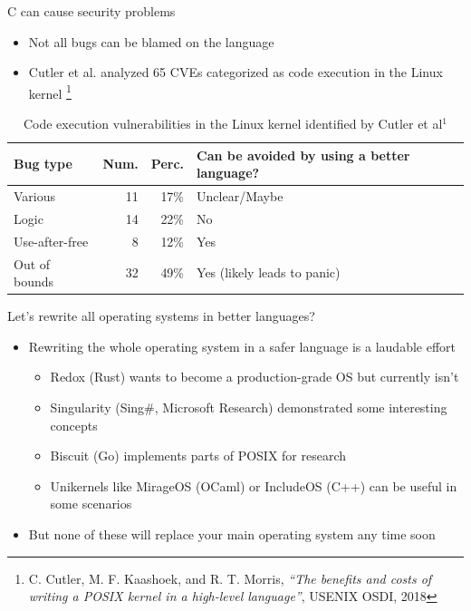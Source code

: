 \documentclass[NET,english,aspectratio=169,notitleframe]{tumbeamer}
\begin{document}
\begin{frame}{C can cause security problems}
\begin{itemize}
\item Not all bugs can be blamed on the language
\item Cutler et al. analyzed 65 CVEs categorized as code execution in the Linux kernel \footnote{C. Cutler, M. F. Kaashoek, and R. T. Morris, \emph{``The benefits and costs of writing a POSIX kernel in a high-level language''}, USENIX OSDI, 2018}
\end{itemize}
\pause
\begin{table}
\centering
\begin{tabular}{ l  r r l }
  \toprule
  Bug type & Num. & Perc. & Can be avoided by using a better language? \\
  \midrule
  Various & 11 & 17\% & Unclear/Maybe \\
  Logic & 14 & 22\% & No \\
  Use-after-free & 8 & 12\% & Yes \\
  Out of bounds & 32 & 49\% & Yes (likely leads to panic) \\
  \bottomrule  
\end{tabular}
\caption{Code execution vulnerabilities in the Linux kernel identified by Cutler et al$^1$}
\end{table}
\end{frame}


\begin{frame}{Let's rewrite all operating systems in better languages?}
\begin{itemize}
\item Rewriting the whole operating system in a safer language is a laudable effort
\begin{itemize}
\item Redox (Rust) wants to become a production-grade OS but currently isn't
\item Singularity (Sing\#, Microsoft Research) demonstrated some interesting concepts
\item Biscuit (Go) implements parts of POSIX for research
\item Unikernels like MirageOS (OCaml) or IncludeOS (C++) can be useful in some scenarios
\end{itemize}
\pause
\item But none of these will replace your main operating system any time soon
\end{itemize}
\end{frame}
\end{document}
